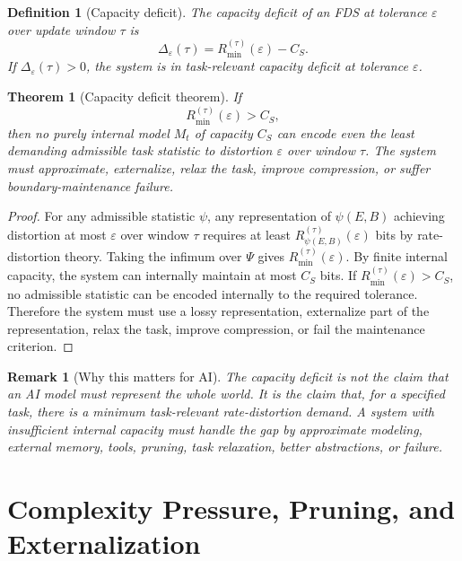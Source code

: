 \documentclass[10pt,a4paper,twocolumn,aps,prl]{revtex4-2}
\newtheorem{definition}{Definition}
\newtheorem{theorem}{Theorem}
\newtheorem{remark}{Remark}
\begin{document}
\begin{definition}[Capacity deficit]
The capacity deficit of an FDS at tolerance $\varepsilon$ over update window $\tau$ is
\begin{equation}
\Delta_{\varepsilon}(\tau)=R_{\min}^{(\tau)}(\varepsilon)-C_S.
\label{eq:capacity-deficit}
\end{equation}
If $\Delta_{\varepsilon}(\tau)>0$, the system is in task-relevant capacity deficit at tolerance $\varepsilon$.
\end{definition}

\begin{theorem}[Capacity deficit theorem]
If
\begin{equation}
R_{\min}^{(\tau)}(\varepsilon)>C_S,
\end{equation}
then no purely internal model $M_t$ of capacity $C_S$ can encode even the least demanding admissible task statistic to distortion $\varepsilon$ over window $\tau$. The system must approximate, externalize, relax the task, improve compression, or suffer boundary-maintenance failure.
\end{theorem}

\begin{proof}
For any admissible statistic $\psi$, any representation of $\psi(E,B)$ achieving distortion at most $\varepsilon$ over window $\tau$ requires at least $R_{\psi(E,B)}^{(\tau)}(\varepsilon)$ bits by rate-distortion theory. Taking the infimum over $\Psi$ gives $R_{\min}^{(\tau)}(\varepsilon)$. By finite internal capacity, the system can internally maintain at most $C_S$ bits. If $R_{\min}^{(\tau)}(\varepsilon)>C_S$, no admissible statistic can be encoded internally to the required tolerance. Therefore the system must use a lossy representation, externalize part of the representation, relax the task, improve compression, or fail the maintenance criterion.
\end{proof}

\begin{remark}[Why this matters for AI]
The capacity deficit is not the claim that an AI model must represent the whole world. It is the claim that, for a specified task, there is a minimum task-relevant rate-distortion demand. A system with insufficient internal capacity must handle the gap by approximate modeling, external memory, tools, pruning, task relaxation, better abstractions, or failure.
\end{remark}

\section{Complexity Pressure, Pruning, and Externalization}
\end{document}
